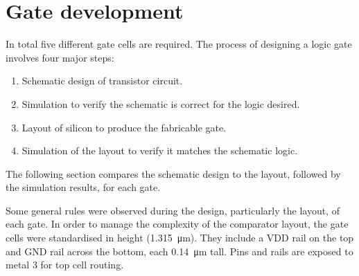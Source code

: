 \section{Gate development}

In total five different gate cells are required. The process of designing a logic gate involves four major steps:
\begin{enumerate}
    \item Schematic design of transistor circuit.
    \item Simulation to verify the schematic is correct for the logic desired.
    \item Layout of silicon to produce the fabricable gate. 
    \item Simulation of the layout to verify it matches the schematic logic.
\end{enumerate}
The following section compares the schematic design to the layout, followed by the simulation results, for each gate. 

Some general rules were observed during the design, particularly the layout, of each gate. 
In order to manage the complexity of the comparator layout, the gate cells were standardised in height (\qty{1.315}{\um}).
They include a VDD rail on the top and GND rail across the bottom, each \qty{0.14}{\um} tall.
Pins and rails are exposed to metal 3 for top cell routing.  

